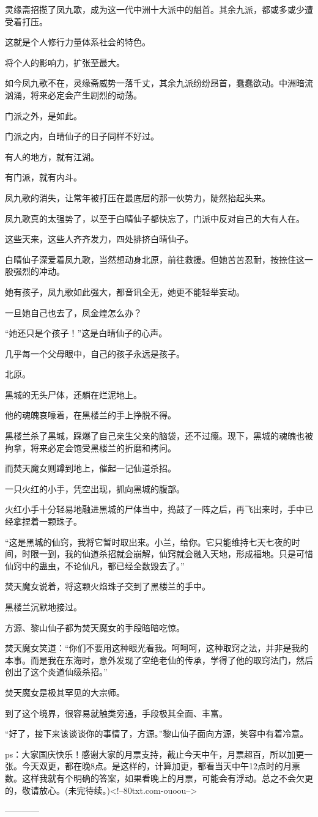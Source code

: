 \begin{this_body}
灵缘斋招揽了凤九歌，成为这一代中洲十大派中的魁首。其余九派，都或多或少遭受着打压。

这就是个人修行力量体系社会的特色。

将个人的影响力，扩张至最大。

如今凤九歌不在，灵缘斋威势一落千丈，其余九派纷纷昂首，蠢蠢欲动。中洲暗流汹涌，将来必定会产生剧烈的动荡。

门派之外，是如此。

门派之内，白晴仙子的日子同样不好过。

有人的地方，就有江湖。

有门派，就有内斗。

凤九歌的消失，让常年被打压在最底层的那一伙势力，陡然抬起头来。

凤九歌真的太强势了，以至于白晴仙子都快忘了，门派中反对自己的大有人在。

这些天来，这些人齐齐发力，四处排挤白晴仙子。

白晴仙子深爱着凤九歌，当然想动身北原，前往救援。但她苦苦忍耐，按捺住这一股强烈的冲动。

她有孩子，凤九歌如此强大，都音讯全无，她更不能轻举妄动。

一旦她自己也去了，凤金煌怎么办？

“她还只是个孩子！”这是白晴仙子的心声。

几乎每一个父母眼中，自己的孩子永远是孩子。

北原。

黑城的无头尸体，还躺在烂泥地上。

他的魂魄哀嚎着，在黑楼兰的手上挣脱不得。

黑楼兰杀了黑城，踩爆了自己亲生父亲的脑袋，还不过瘾。现下，黑城的魂魄也被拘拿，将来必定会饱受黑楼兰的折磨和拷问。

而焚天魔女则蹲到地上，催起一记仙道杀招。

一只火红的小手，凭空出现，抓向黑城的腹部。

火红小手十分轻易地融进黑城的尸体当中，捣鼓了一阵之后，再飞出来时，手中已经拿捏着一颗珠子。

“这是黑城的仙窍，我将它暂时取出来。小兰，给你。它只能维持七天七夜的时间，时限一到，我的仙道杀招就会崩解，仙窍就会融入天地，形成福地。只是可惜仙窍中的蛊虫，不论仙凡，都已经全数毁去了。”

焚天魔女说着，将这颗火焰珠子交到了黑楼兰的手中。

黑楼兰沉默地接过。

方源、黎山仙子都为焚天魔女的手段暗暗吃惊。

焚天魔女笑道：“你们不要用这种眼光看我。呵呵呵，这种取窍之法，并非是我的本事。而是我在东海时，意外发现了空绝老仙的传承，学得了他的取窍法门，然后创出了这个炎道仙级杀招。”

焚天魔女是极其罕见的大宗师。

到了这个境界，很容易就触类旁通，手段极其全面、丰富。

“好了，接下来该谈谈你的事情了，方源。”黎山仙子面向方源，笑容中有着冷意。

ps：大家国庆快乐！感谢大家的月票支持，截止今天中午，月票超百，所以加更一张。今天双更，都在晚8点。是这样的，计算加更，都看当天中午12点时的月票数。这样我就有个明确的答案，如果看晚上的月票，可能会有浮动。总之不会欠更的，敬请放心。(未完待续。)<!--80txt.com-ouoou-->

------------

\end{this_body}

